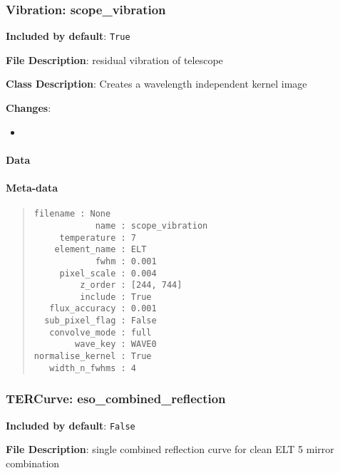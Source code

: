 \subsubsection{Vibration: \textquotedbl{}scope\_vibration\textquotedbl{}%
  \label{vibration-scope-vibration}%
}

\textbf{Included by default}: \texttt{True}

\textbf{File Description}: residual vibration of telescope

\textbf{Class Description}: Creates a wavelength independent kernel image

\textbf{Changes}:

\begin{itemize}
\item \end{itemize}


\paragraph{Data%
  \label{id1}%
}


\paragraph{Meta-data%
  \label{id2}%
}

\begin{quote}
\begin{alltt}
\begin{lstlisting}[frame=single]
        filename : None
            name : scope_vibration
     temperature : 7
    element_name : ELT
            fwhm : 0.001
     pixel_scale : 0.004
         z_order : [244, 744]
         include : True
   flux_accuracy : 0.001
  sub_pixel_flag : False
   convolve_mode : full
        wave_key : WAVE0
normalise_kernel : True
   width_n_fwhms : 4
\end{lstlisting}
\end{alltt}
\end{quote}


\subsubsection{TERCurve: \textquotedbl{}eso\_combined\_reflection\textquotedbl{}%
  \label{tercurve-eso-combined-reflection}%
}

\textbf{Included by default}: \texttt{False}

\textbf{File Description}: single combined reflection curve for clean ELT 5 mirror combination

